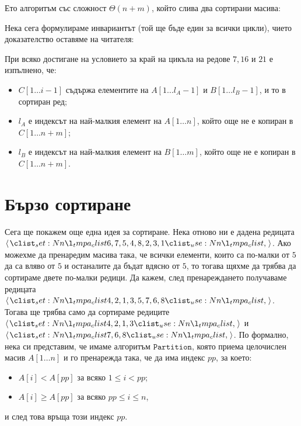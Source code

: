 \newpage

Ето алгоритъм със сложност $\Theta(n + m)$, който слива два сортирани масива:


Нека сега формулираме инвариантът (той ще бъде един за всички цикли), чието доказателство оставяме на читателя:
\begin{invariant}
    При всяко достигане на условието за край на цикъла на редове $7, 16$ и $21$ е изпълнено, че:
    \begin{itemize}
        \item $C[1 \dots i - 1]$ съдържа елементите на $A[1 \dots l_A - 1]$ и $B[1 \dots l_B - 1]$, и то в сортиран ред;
        \item $l_A$ е индексът на най-малкия елемент на $A[1 \dots n]$, който още не е копиран в $C[1 \dots n + m]$;
        \item $l_B$ е индексът на най-малкия елемент на $B[1 \dots m]$, който още не е копиран в $C[1 \dots n + m]$.
    \end{itemize}
\end{invariant}

\section{Бързо сортиране}
Сега ще покажем още една идея за сортиране.
Нека отново ни е дадена редицата $\opair{6, 7, 5, 4, 8, 2, 3, 1}$.
Ако можехме да пренаредим масива така, че всички елементи, които са по-малки от $5$ да са вляво от $5$ и останалите да бъдат вдясно от $5$, то тогава щяхме да трябва да сортираме двете по-малки редици.
Да кажем, след пренареждането получаваме редицата $\opair{4, 2, 1, 3, 5, 7, 6, 8}$.
Тогава ще трябва само да сортираме редиците $\opair{4, 2, 1, 3}$ и $\opair{7, 6, 8}$.
По формално, нека си представим, че имаме алгоритъм $\mathtt{Partition}$, която приема целочислен масив $A[1 \dots n]$ и го пренарежда така, че да има индекс $pp$, за което:
\begin{itemize}
    \item $A[i] < A[pp]$ за всяко $1 \leq i < pp$;
    \item $A[i] \geq A[pp]$ за всяко $pp \leq i \leq n$,
\end{itemize}
и след това връща този индекс $pp$.

